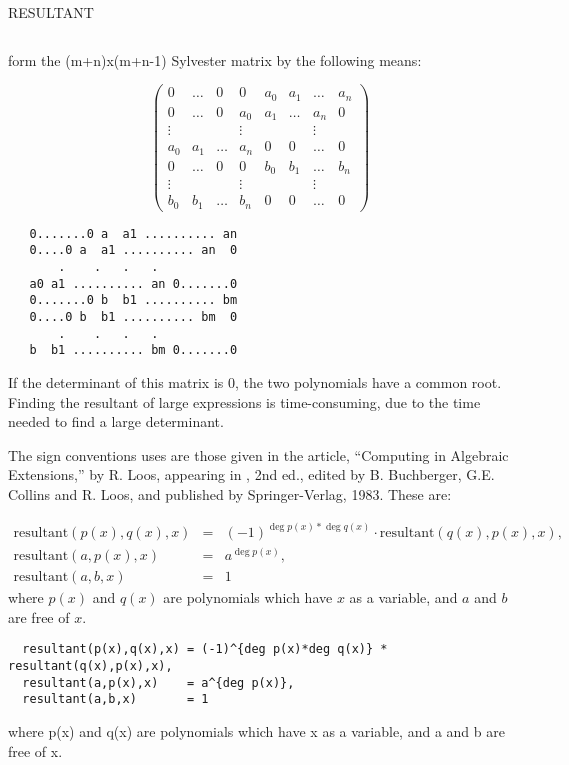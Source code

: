 \begin{Operator}{RESULTANT}
\begin{Comments}
\begin{INFO}
{\begin{verbatim}
\end{verbatim}}
\end{INFO}
form the  (m+n)x(m+n-1) Sylvester matrix by the following means:
\begin{TEX}
\begin{displaymath}
  \left(\begin{array}{cccccccc}
           0&\ldots&0&0&a_0&a_1&\ldots&a_n\\
	   0&\ldots&0&a_0&a_1&\ldots&a_n&0\\
	   \vdots&&&\vdots&&&\vdots\\
	   a_0&a_1&\ldots&a_n&0&0&\ldots&0\\
	   0&\ldots&0&0&b_0&b_1&\ldots&b_n\\
	   \vdots&&&\vdots&&&\vdots\\
	   b_0&b_1&\ldots&b_n&0&0&\ldots&0
         \end{array}\right)
\end{displaymath}
\end{TEX}
\begin{INFO}
{\begin{verbatim}
   0.......0 a  a1 .......... an
   0....0 a  a1 .......... an  0
       .    .   .   .  
   a0 a1 .......... an 0.......0
   0.......0 b  b1 .......... bm
   0....0 b  b1 .......... bm  0
       .    .   .   .  
   b  b1 .......... bm 0.......0  

\end{verbatim}}
\end{INFO}

If the determinant of this matrix is 0, the two polynomials have a common
root.  Finding the resultant of large expressions is time-consuming, due
to the time needed to find a large determinant.

The sign conventions  uses are those given in the article,
``Computing in Algebraic Extensions,'' by R.  Loos, appearing in
, 2nd ed.,
edited by B.  Buchberger, G.E.  Collins and R.  Loos, and published by
Springer-Verlag, 1983.
These are:
\begin{TEX}
\begin{eqnarray*}
  \mbox{resultant}(p(x),q(x),x)
	&=& (-1)^{\deg p(x)*\deg q(x)}\cdot\mbox{resultant}(q(x),p(x),x),\\
  \mbox{resultant}(a,p(x),x) &=& a^{\deg p(x)},\\
  \mbox{resultant}(a,b,x) &=& 1
\end{eqnarray*}
where $p(x)$ and $q(x)$ are polynomials which have $x$ as a variable, and
$a$ and $b$ are free of $x$.
\end{TEX}
\begin{INFO}
{
\begin{verbatim}
  resultant(p(x),q(x),x) = (-1)^{deg p(x)*deg q(x)} * resultant(q(x),p(x),x),
  resultant(a,p(x),x)    = a^{deg p(x)},
  resultant(a,b,x)       = 1
\end{verbatim}
where p(x) and q(x) are polynomials which have x as a variable, and
a and b are free of x.
}
\end{INFO}


\end{Comments}
\end{Operator}
